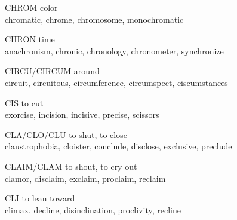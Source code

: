 \begin{flashcard}[Roots]{CHROM}
 color\\
\vspace{0.2in}
 chromatic, chrome, chromosome, monochromatic\\
\end{flashcard}

\begin{flashcard}[Roots]{CHRON}
 time\\
\vspace{0.2in}
anachronism, chronic, chronology, chronometer, synchronize\\
\end{flashcard}

\begin{flashcard}[Roots]{CIRCU/CIRCUM}
around\\
\vspace{0.2in}
circuit, circuitous, circumference, circumspect, ciscumstances\\
\end{flashcard}

\begin{flashcard}[Roots]{CIS}
to cut\\
\vspace{0.2in}
exorcise, incision, incisive, precise, scissors\\
\end{flashcard}

\begin{flashcard}[Roots]{CLA/CLO/CLU}
to shut, to close\\
\vspace{0.2in}
claustrophobia, cloister, conclude, disclose, exclusive, preclude\\
\end{flashcard}

\begin{flashcard}[Roots]{CLAIM/CLAM}
to shout, to cry out\\
\vspace{0.2in}
clamor, disclaim, exclaim, proclaim, reclaim\\
\end{flashcard}

\begin{flashcard}[Roots]{CLI}
to lean toward\\
\vspace{0.2in}
climax, decline, disinclination, proclivity, recline\\
\end{flashcard}

